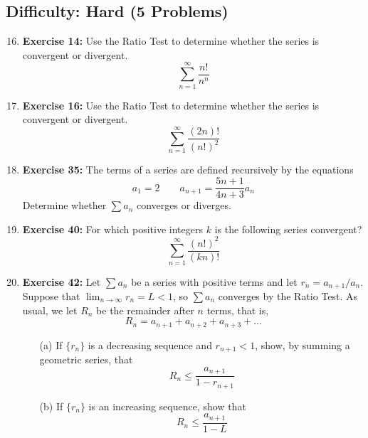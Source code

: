 \documentclass{article}
\begin{document}
\hrulefill
\vspace{1em}

\subsection*{Difficulty: Hard (5 Problems)}
\begin{enumerate}
    \setcounter{enumi}{15} %
    \item \textbf{Exercise 14:} Use the Ratio Test to determine whether the series is convergent or divergent.
    \[ \sum_{n=1}^{\infty} \frac{n!}{n^n} \]
    
    \item \textbf{Exercise 16:} Use the Ratio Test to determine whether the series is convergent or divergent.
    \[ \sum_{n=1}^{\infty} \frac{(2n)!}{(n!)^2} \]
    
    \item \textbf{Exercise 35:} The terms of a series are defined recursively by the equations
    \[ a_1 = 2 \qquad a_{n+1} = \frac{5n+1}{4n+3} a_n \]
    Determine whether $\sum a_n$ converges or diverges.
    
    \item \textbf{Exercise 40:} For which positive integers $k$ is the following series convergent?
    \[ \sum_{n=1}^{\infty} \frac{(n!)^2}{(kn)!} \]
    
    \item \textbf{Exercise 42:} Let $\sum a_n$ be a series with positive terms and let $r_n = a_{n+1}/a_n$. Suppose that $\lim_{n \to \infty} r_n = L < 1$, so $\sum a_n$ converges by the Ratio Test. As usual, we let $R_n$ be the remainder after $n$ terms, that is,
    \[ R_n = a_{n+1} + a_{n+2} + a_{n+3} + \dots \]
    \begin{enumerate}
        \item[(a)] If $\{r_n\}$ is a decreasing sequence and $r_{n+1} < 1$, show, by summing a geometric series, that
        \[ R_n \le \frac{a_{n+1}}{1-r_{n+1}} \]
        \item[(b)] If $\{r_n\}$ is an increasing sequence, show that
        \[ R_n \le \frac{a_{n+1}}{1-L} \]
    \end{enumerate}
\end{enumerate}
\end{document}
